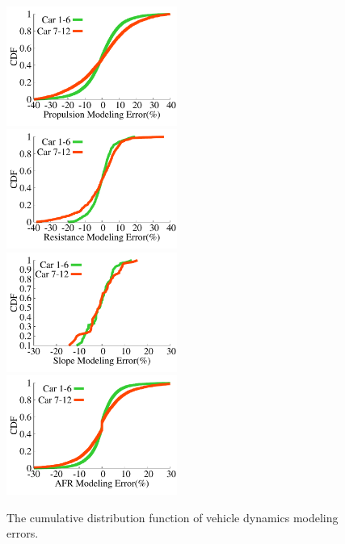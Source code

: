 \begin{figure}[ht]
\begin{center}
\vspace{-0.2cm}
\includegraphics[width=2.2in,angle=0]{Figs/EcoDrive/evaluation/propulsion_error_cdf_2.pdf}
\vspace{-0.2cm}
\includegraphics[width=2.2in,angle=0]{Figs/EcoDrive/evaluation/resistance_error_cdf_2.pdf}
\vspace{-0.2cm}
\includegraphics[width=2.2in,angle=0]{Figs/EcoDrive/evaluation/slope_error_cdf_2.pdf}
\vspace{-0.2cm}
\includegraphics[width=2.2in,angle=0]{Figs/EcoDrive/evaluation/afr_profile_error_cdf_2.pdf}
\caption{The cumulative distribution function of vehicle dynamics modeling errors.}
\vspace{-0.6cm}
\label{modelingaccuracy}
\end{center}
\end{figure}

